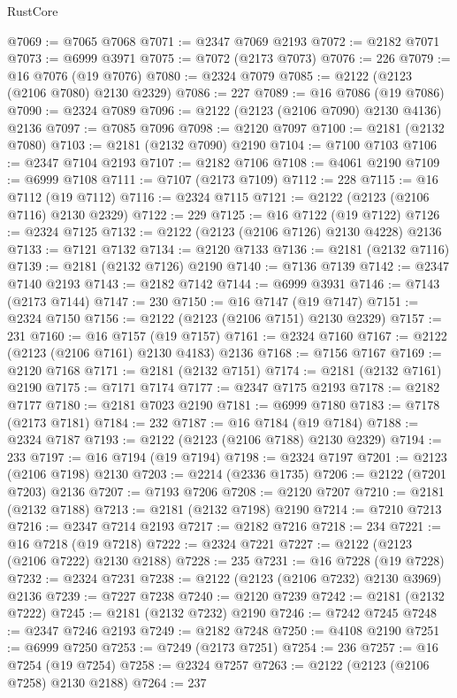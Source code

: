 \begin{lexlean}{RustCore}
\begin{coremodule}
@7069 := @7065 @7068
@7071 := @2347 @7069 @2193
@7072 := @2182 @7071
@7073 := @6999 @3971
@7075 := @7072 (@2173 @7073)
@7076 := 226
@7079 := @16 @7076 (@19 @7076)
@7080 := @2324 @7079
@7085 := @2122 (@2123 (@2106 @7080) @2130 @2329)
@7086 := 227
@7089 := @16 @7086 (@19 @7086)
@7090 := @2324 @7089
@7096 := @2122 (@2123 (@2106 @7090) @2130 @4136) @2136
@7097 := @7085 @7096
@7098 := @2120 @7097
@7100 := @2181 (@2132 @7080)
@7103 := @2181 (@2132 @7090) @2190
@7104 := @7100 @7103
@7106 := @2347 @7104 @2193
@7107 := @2182 @7106
@7108 := @4061 @2190
@7109 := @6999 @7108
@7111 := @7107 (@2173 @7109)
@7112 := 228
@7115 := @16 @7112 (@19 @7112)
@7116 := @2324 @7115
@7121 := @2122 (@2123 (@2106 @7116) @2130 @2329)
@7122 := 229
@7125 := @16 @7122 (@19 @7122)
@7126 := @2324 @7125
@7132 := @2122 (@2123 (@2106 @7126) @2130 @4228) @2136
@7133 := @7121 @7132
@7134 := @2120 @7133
@7136 := @2181 (@2132 @7116)
@7139 := @2181 (@2132 @7126) @2190
@7140 := @7136 @7139
@7142 := @2347 @7140 @2193
@7143 := @2182 @7142
@7144 := @6999 @3931
@7146 := @7143 (@2173 @7144)
@7147 := 230
@7150 := @16 @7147 (@19 @7147)
@7151 := @2324 @7150
@7156 := @2122 (@2123 (@2106 @7151) @2130 @2329)
@7157 := 231
@7160 := @16 @7157 (@19 @7157)
@7161 := @2324 @7160
@7167 := @2122 (@2123 (@2106 @7161) @2130 @4183) @2136
@7168 := @7156 @7167
@7169 := @2120 @7168
@7171 := @2181 (@2132 @7151)
@7174 := @2181 (@2132 @7161) @2190
@7175 := @7171 @7174
@7177 := @2347 @7175 @2193
@7178 := @2182 @7177
@7180 := @2181 @7023 @2190
@7181 := @6999 @7180
@7183 := @7178 (@2173 @7181)
@7184 := 232
@7187 := @16 @7184 (@19 @7184)
@7188 := @2324 @7187
@7193 := @2122 (@2123 (@2106 @7188) @2130 @2329)
@7194 := 233
@7197 := @16 @7194 (@19 @7194)
@7198 := @2324 @7197
@7201 := @2123 (@2106 @7198) @2130
@7203 := @2214 (@2336 @1735)
@7206 := @2122 (@7201 @7203) @2136
@7207 := @7193 @7206
@7208 := @2120 @7207
@7210 := @2181 (@2132 @7188)
@7213 := @2181 (@2132 @7198) @2190
@7214 := @7210 @7213
@7216 := @2347 @7214 @2193
@7217 := @2182 @7216
@7218 := 234
@7221 := @16 @7218 (@19 @7218)
@7222 := @2324 @7221
@7227 := @2122 (@2123 (@2106 @7222) @2130 @2188)
@7228 := 235
@7231 := @16 @7228 (@19 @7228)
@7232 := @2324 @7231
@7238 := @2122 (@2123 (@2106 @7232) @2130 @3969) @2136
@7239 := @7227 @7238
@7240 := @2120 @7239
@7242 := @2181 (@2132 @7222)
@7245 := @2181 (@2132 @7232) @2190
@7246 := @7242 @7245
@7248 := @2347 @7246 @2193
@7249 := @2182 @7248
@7250 := @4108 @2190
@7251 := @6999 @7250
@7253 := @7249 (@2173 @7251)
@7254 := 236
@7257 := @16 @7254 (@19 @7254)
@7258 := @2324 @7257
@7263 := @2122 (@2123 (@2106 @7258) @2130 @2188)
@7264 := 237

\end{coremodule}
\end{lexlean}
